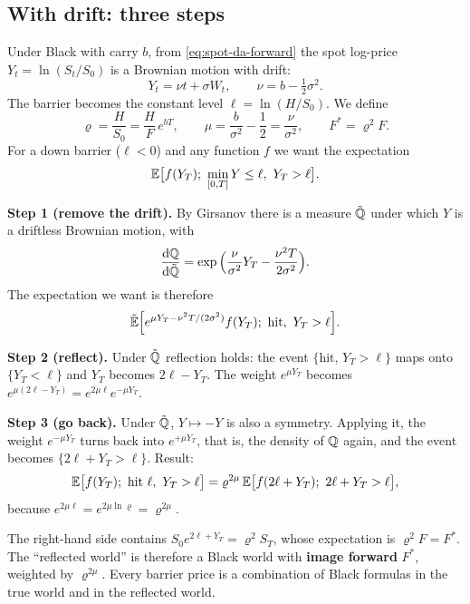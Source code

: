 \subsection{With drift: three steps}
Under Black with carry $b$, from \eqref{eq:spot-da-forward} the spot log-price $Y_t=\ln(S_t/S_0)$ is a Brownian
motion with drift:
\[
Y_t=\nu t+\sigma W_t,\qquad \nu=b-\tfrac12\sigma^2 .
\]
The barrier becomes the constant level $\ell=\ln(H/S_0)$. We define
\begin{equation}
\varrho=\frac H{S_0}=\frac HF\,e^{bT},\qquad \mu=\frac b{\sigma^2}-\frac12=\frac\nu{\sigma^2},\qquad F^*=\varrho^2F .
\end{equation}
For a down barrier ($\ell<0$) and any function $f$ we want the expectation
\[
\E\big[f(Y_T);\ \min_{[0,T]} Y\le\ell,\ Y_T>\ell\big].
\]

\noindent\textbf{Step 1 (remove the drift).} By Girsanov there is a measure $\tilde{\mathbb{Q}}$ under which $Y$ is a
driftless Brownian motion, with
\[
\frac{\mathop{}\!\mathrm{d}\mathbb{Q}}{\mathop{}\!\mathrm{d}\tilde{\mathbb{Q}}}=\exp\Big(\frac{\nu}{\sigma^2}Y_T-\frac{\nu^2T}{2\sigma^2}\Big).
\]
The expectation we want is therefore
\[
\tilde\E\Big[e^{\mu Y_T-\nu^2T/(2\sigma^2)}f(Y_T);\ \text{hit},\ Y_T>\ell\Big].
\]

\noindent\textbf{Step 2 (reflect).} Under $\tilde{\mathbb{Q}}$ reflection holds: the event $\{\text{hit},\,Y_T>\ell\}$ maps onto
$\{Y_T<\ell\}$ and $Y_T$ becomes $2\ell-Y_T$. The weight $e^{\mu Y_T}$ becomes
$e^{\mu(2\ell-Y_T)}=e^{2\mu\ell}e^{-\mu Y_T}$.

\noindent\textbf{Step 3 (go back).} Under $\tilde{\mathbb{Q}}$, $Y\mapsto-Y$ is also a symmetry. Applying it, the weight
$e^{-\mu Y_T}$ turns back into $e^{+\mu Y_T}$, that is, the density of $\mathbb{Q}$ again, and the event becomes
$\{2\ell+Y_T>\ell\}$. Result:
\begin{equation}\label{eq:immagine}
\E\big[f(Y_T);\ \text{hit }\ell,\ Y_T>\ell\big]=\varrho^{2\mu}\,\E\big[f(2\ell+Y_T);\ 2\ell+Y_T>\ell\big],
\end{equation}
because $e^{2\mu\ell}=e^{2\mu\ln\varrho}=\varrho^{2\mu}$.

\begin{idea}[title={The reflected world}]
The right-hand side contains $S_0e^{2\ell+Y_T}=\varrho^2S_T$, whose expectation is $\varrho^2F=F^*$. The ``reflected
world'' is therefore a Black world with \textbf{image forward} $F^*$, weighted by $\varrho^{2\mu}$. Every barrier
price is a combination of Black formulas in the true world and in the reflected world.
\end{idea}

